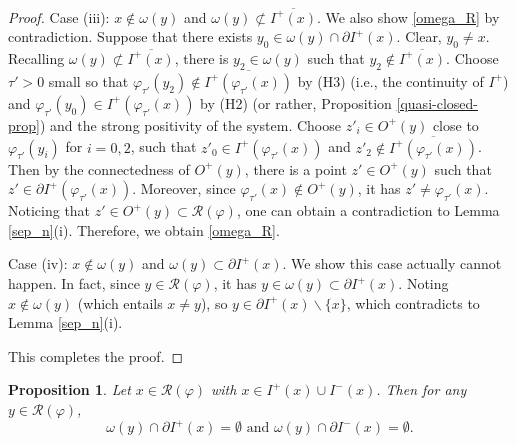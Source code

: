 \documentclass[a4paper,11pt]{article}
\theoremstyle{plain}
\newtheorem{prop}[thm]{Proposition}
\theoremstyle{definition}
\numberwithin{equation}{section}
\begin{document}
\begin{proof}
        Case (iii): $x\notin\omega(y)$ and $\omega(y)\not\subset  \overline{I^{+}(x)}$.
		We also show \eqref{omega_R} by contradiction.
		Suppose that there exists $y_{0} \in\omega(y)\cap\partial  I^{+}(x)$. Clear, $y_{0}\neq x$. Recalling $\omega(y)\not\subset  \overline{I^{+}(x)}$, there is $y_{2} \in\omega(y)$ such that $y_{2}\notin  \overline{I^{+}(x)}$.
        Choose $\tau'>0$ small so that $\varphi_{\tau'}(y_{2})\notin  \overline{I^{+}(\varphi_{\tau'}(x))}$ by (H3) (i.e., the continuity of $I^{+}$) and $\varphi_{\tau'}(y_{0})\in  I^{+}(\varphi_{\tau'}(x))$ by (H2) (or rather, Proposition \ref{quasi-closed-prop}) and the strong positivity of the system. Choose $z'_i\in O^{+}(y)$ close to $\varphi_{\tau'}(y_i)$ for $i=0,2$,
		such that $z'_0\in  I^{+}(\varphi_{\tau'}(x))$ and $z'_2\notin  \overline{I^{+}(\varphi_{\tau'}(x))}$. Then by the connectedness of $O^{+}(y)$, there is a point $z'\in O^{+}(y)$ such that $z'\in \partial  I^{+}(\varphi_{\tau'}(x))$. Moreover, since $\varphi_{\tau'}(x)\notin O^{+}(y)$, it has $z'\neq\varphi_{\tau'}(x)$. Noticing that $z'\in O^{+}(y)\subset \mathcal{R}(\varphi)$, one can obtain a contradiction to Lemma \ref{sep_n}(i). Therefore, we obtain \eqref{omega_R}.
        
        Case (iv): $x\notin\omega(y)$ and $\omega(y)\subset  \partial{I^{+}(x)}$. We show this case actually cannot happen. In fact, since $y\in \mathcal{R}(\varphi)$, it has $y\in \omega(y)\subset  \partial{I^{+}(x)}$. Noting $x\notin\omega(y)$ (which entails $x\neq y$), so $y\in \partial{I^{+}}(x)\backslash\{x\}$, which contradicts to Lemma \ref{sep_n}(i).

        This completes the proof.
	\end{proof}

    \begin{prop}\label{sep_n_2}
		Let $x\in \mathcal{R}(\varphi)$ with $x\in I^{+}(x)\cup I^{-}(x)$. Then for any $y\in \mathcal{R}(\varphi)$,
        \begin{equation*}
			\omega(y)\cap\partial I^{+}(x)=\emptyset \text{~and~} \omega(y)\cap\partial I^{-}(x)=\emptyset.
		\end{equation*}
	\end{prop}
\end{document}
